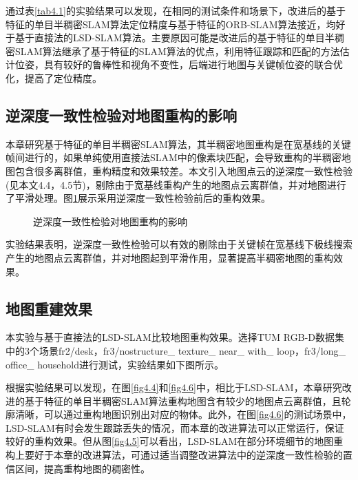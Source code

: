 通过表\ref{tab4.1}的实验结果可以发现，在相同的测试条件和场景下，改进后的基于特征的单目半稠密SLAM算法定位精度与基于特征的ORB-SLAM算法接近，均好于基于直接法的LSD-SLAM算法。主要原因可能是改进后的基于特征的单目半稠密SLAM算法继承了基于特征的SLAM算法的优点，利用特征跟踪和匹配的方法估计位姿，具有较好的鲁棒性和视角不变性，后端进行地图与关键帧位姿的联合优化，提高了定位精度。

\subsection{逆深度一致性检验对地图重构的影响}
本章研究基于特征的单目半稠密SLAM算法，其半稠密地图重构是在宽基线的关键帧间进行的，如果单纯使用直接法SLAM中的像素块匹配，会导致重构的半稠密地图包含很多离群值，重构精度和效果较差。本文引入地图点云的逆深度一致性检验(见本文4.4，4.5节)，剔除由于宽基线重构产生的地图点云离群值，并对地图进行了平滑处理。图\ref{fig4.3}展示采用逆深度一致性检验前后的重构效果。

\begin{figure}[h]
    \centering
     \caption{逆深度一致性检验对地图重构的影响}
\label{fig4.3}
\end{figure}

实验结果表明，逆深度一致性检验可以有效的剔除由于关键帧在宽基线下极线搜索产生的地图点云离群值，并对地图起到平滑作用，显著提高半稠密地图的重构效果。

\subsection{地图重建效果}
本实验与基于直接法的LSD-SLAM比较地图重构效果。选择TUM RGB-D数据集中的3个场景fr2/desk，fr3/nostructure\_ texture\_ near\_ with\_ loop，fr3/long\_ office\_ household进行测试，实验结果如下图所示。

根据实验结果可以发现，在图\ref{fig4.4}和\ref{fig4.6}中，相比于LSD-SLAM，本章研究改进的基于特征的单目半稠密SLAM算法重构地图含有较少的地图点云离群值，且轮廓清晰，可以通过重构地图识别出对应的物体。此外，在图\ref{fig4.6}的测试场景中，LSD-SLAM有时会发生跟踪丢失的情况，而本章的改进算法可以正常运行，保证较好的重构效果。但从图\ref{fig4.5}可以看出，LSD-SLAM在部分环境细节的地图重构上要好于本章的改进算法，可通过适当调整改进算法中的逆深度一致性检验的置信区间，提高重构地图的稠密性。


